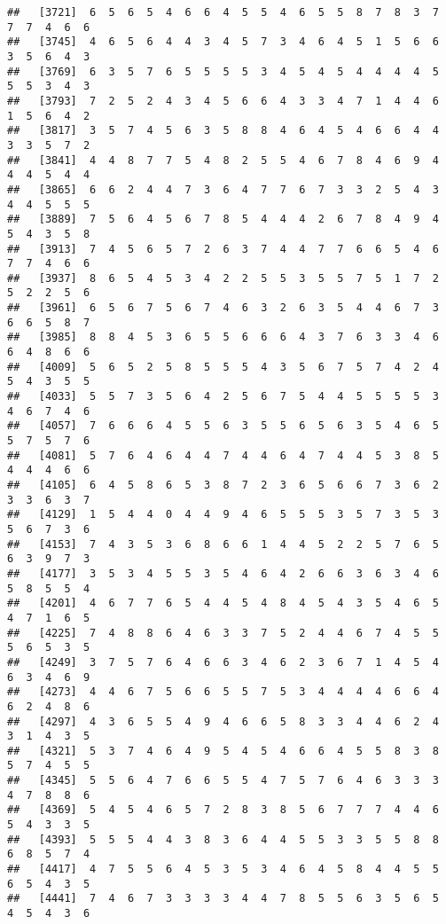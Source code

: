 \documentclass[
]{book}
\begin{document}
\begin{verbatim}
##   [3721]  6  5  6  5  4  6  6  4  5  5  4  6  5  5  8  7  8  3  7  7  7  4  6  6
##   [3745]  4  6  5  6  4  4  3  4  5  7  3  4  6  4  5  1  5  6  6  3  5  6  4  3
##   [3769]  6  3  5  7  6  5  5  5  5  3  4  5  4  5  4  4  4  4  5  5  5  3  4  3
##   [3793]  7  2  5  2  4  3  4  5  6  6  4  3  3  4  7  1  4  4  6  1  5  6  4  2
##   [3817]  3  5  7  4  5  6  3  5  8  8  4  6  4  5  4  6  6  4  4  3  3  5  7  2
##   [3841]  4  4  8  7  7  5  4  8  2  5  5  4  6  7  8  4  6  9  4  4  4  5  4  4
##   [3865]  6  6  2  4  4  7  3  6  4  7  7  6  7  3  3  2  5  4  3  4  4  5  5  5
##   [3889]  7  5  6  4  5  6  7  8  5  4  4  4  2  6  7  8  4  9  4  5  4  3  5  8
##   [3913]  7  4  5  6  5  7  2  6  3  7  4  4  7  7  6  6  5  4  6  7  7  4  6  6
##   [3937]  8  6  5  4  5  3  4  2  2  5  5  3  5  5  7  5  1  7  2  5  2  2  5  6
##   [3961]  6  5  6  7  5  6  7  4  6  3  2  6  3  5  4  4  6  7  3  6  6  5  8  7
##   [3985]  8  8  4  5  3  6  5  5  6  6  6  4  3  7  6  3  3  4  6  6  4  8  6  6
##   [4009]  5  6  5  2  5  8  5  5  5  4  3  5  6  7  5  7  4  2  4  5  4  3  5  5
##   [4033]  5  5  7  3  5  6  4  2  5  6  7  5  4  4  5  5  5  5  3  4  6  7  4  6
##   [4057]  7  6  6  6  4  5  5  6  3  5  5  6  5  6  3  5  4  6  5  5  7  5  7  6
##   [4081]  5  7  6  4  6  4  4  7  4  4  6  4  7  4  4  5  3  8  5  4  4  4  6  6
##   [4105]  6  4  5  8  6  5  3  8  7  2  3  6  5  6  6  7  3  6  2  3  3  6  3  7
##   [4129]  1  5  4  4  0  4  4  9  4  6  5  5  5  3  5  7  3  5  3  5  6  7  3  6
##   [4153]  7  4  3  5  3  6  8  6  6  1  4  4  5  2  2  5  7  6  5  6  3  9  7  3
##   [4177]  3  5  3  4  5  5  3  5  4  6  4  2  6  6  3  6  3  4  6  5  8  5  5  4
##   [4201]  4  6  7  7  6  5  4  4  5  4  8  4  5  4  3  5  4  6  5  4  7  1  6  5
##   [4225]  7  4  8  8  6  4  6  3  3  7  5  2  4  4  6  7  4  5  5  5  6  5  3  5
##   [4249]  3  7  5  7  6  4  6  6  3  4  6  2  3  6  7  1  4  5  4  6  3  4  6  9
##   [4273]  4  4  6  7  5  6  6  5  5  7  5  3  4  4  4  4  6  6  4  6  2  4  8  6
##   [4297]  4  3  6  5  5  4  9  4  6  6  5  8  3  3  4  4  6  2  4  3  1  4  3  5
##   [4321]  5  3  7  4  6  4  9  5  4  5  4  6  6  4  5  5  8  3  8  5  7  4  5  5
##   [4345]  5  5  6  4  7  6  6  5  5  4  7  5  7  6  4  6  3  3  3  4  7  8  8  6
##   [4369]  5  4  5  4  6  5  7  2  8  3  8  5  6  7  7  7  4  4  6  5  4  3  3  5
##   [4393]  5  5  5  4  4  3  8  3  6  4  4  5  5  3  3  5  5  8  8  6  8  5  7  4
##   [4417]  4  7  5  5  6  4  5  3  5  3  4  6  4  5  8  4  4  5  5  6  5  4  3  5
##   [4441]  7  4  6  7  3  3  3  3  4  4  7  8  5  5  6  3  5  6  5  4  5  4  3  6

\end{verbatim}
\end{document}
